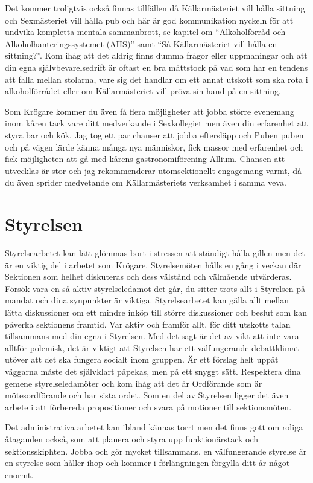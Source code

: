 \documentclass[10pt]{article}
\begin{document}
Det kommer troligtvis också finnas tillfällen då Källarmästeriet vill hålla sittning och Sexmästeriet vill hålla pub och här är god kommunikation nyckeln för att undvika kompletta mentala sammanbrott, se kapitel om ``Alkoholförråd och Alkoholhanteringssystemet (AHS)'' samt ``Så Källarmästeriet vill hålla en sittning?''. Kom ihåg att det aldrig finns dumma frågor eller uppmaningar och att din egna självbevarelsedrift är oftast en bra måttstock på vad som har en tendens att falla mellan stolarna, vare sig det handlar om ett annat utskott som ska rota i alkoholförrådet eller om Källarmästeriet vill pröva sin hand på en sittning.

Som Krögare kommer du även få flera möjligheter att jobba större evenemang inom kåren tack vare ditt medverkande i Sexkollegiet men även din erfarenhet att styra bar och kök. Jag tog ett par chanser att jobba eftersläpp och Puben puben och på vägen lärde känna många nya människor, fick massor med erfarenhet och fick möjligheten att gå med kårens gastronomiförening Allium. Chansen att utvecklas är stor och jag rekommenderar utomsektionellt engagemang varmt, då du även sprider medvetande om Källarmästeriets verksamhet i samma veva.

\section{Styrelsen}
Styrelsearbetet kan lätt glömmas bort i stressen att ständigt hålla gillen men det är en viktig del i arbetet som Krögare. Styrelsemöten hålls en gång i veckan där Sektionen som helhet diskuteras och dess välstånd och välmående utvärderas. Försök vara en så aktiv styrelseledamot det går, du sitter trots allt i Styrelsen på mandat och dina synpunkter är viktiga. Styrelsearbetet kan gälla allt mellan lätta diskussioner om ett mindre inköp till större diskussioner och beslut som kan påverka sektionens framtid. Var aktiv och framför allt, för ditt utskotts talan tillsammans med din egna i Styrelsen. Med det sagt är det av vikt att inte vara alltför polemisk, det är viktigt att Styrelsen har ett välfungerande debattklimat utöver att det ska fungera socialt inom gruppen. Är ett förslag helt uppåt väggarna måste det självklart påpekas, men på ett snyggt sätt. Respektera dina gemene styrelseledamöter och kom ihåg att det är Ordförande som är mötesordförande och har sista ordet. Som en del av Styrelsen ligger det även arbete i att förbereda propositioner och svara på motioner till sektionsmöten.

Det administrativa arbetet kan ibland kännas torrt men det finns gott om roliga åtaganden också, som att planera och styra upp funktionärstack och sektionsskiphten. Jobba och gör mycket tillsammans, en välfungerande styrelse är en styrelse som håller ihop och kommer i förlängningen förgylla ditt år något enormt.
\end{document}
